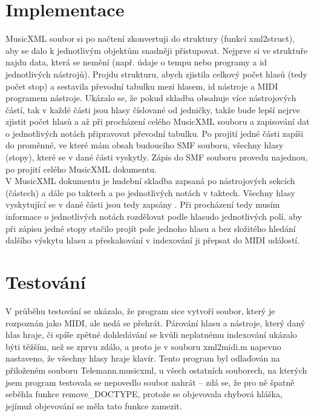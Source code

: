 \documentclass[12pt,a4paper,titlepage]{article}
\begin{document}
\section{Implementace}
MusicXML soubor si po načtení zkonvertuji do struktury (funkcí xml2struct), aby se dalo k jednotlivým objektům snadněji přistupovat. Nejprve si ve struktuře najdu data, která se nemění (např. údaje o tempu nebo programy a id jednotlivých nástrojů). Projdu strukturu, abych zjistila celkový počet hlasů (tedy počet stop) a sestavila převodní tabulku mezi hlasem, id nástroje a MIDI programem nástroje. Ukázalo se, že pokud skladba obsahuje více nástrojových částí, tak v každé části jsou hlasy číslované od jedničky, takže bude lepší nejrve zjistit počet hlasů a až při procházení celého MusicXML souboru a zapisování dat o jednotlivých notách připravovat převodní tabulku. Po projití jedné části zapíši do proměnné, ve které mám obsah budoucího SMF souboru, všechny hlasy (stopy), které se v dané části vyskytly. Zápis do SMF souboru provedu najednou, po projití celého MusicXML dokumentu.\\
V MusicXML dokumentu je hudební skladba zapsaná po nástrojových sekcích (částech) a dále po taktech a po jednotlivých notách v taktech. Všechny hlasy vyskytující se v dané části jsou tedy zapsány . Při procházení tedy musím informace o jednotlivých notách rozdělovat podle hlasudo jednotlivých polí, aby při zápisu jedné stopy stačilo projít pole jednoho hlasu a bez složitého hledání dalšího výskytu hlasu a přeskakování v indexování ji přepsat do MIDI událostí.\\
\section{Testování}
V průběhu testování se ukázalo, že program sice vytvoří soubor, který je rozpoznán jako MIDI, ale nedá se přehrát. Párování hlasu a nástroje, který daný hlas hraje, či spíše zpětné dohledávání se kvůli neplatnému indexování ukázalo býti těžším, než se zprvu zdálo, a proto je v souboru xml2midi.m napevno nastaveno, že všechny hlasy hraje klavír. Tento program byl odlaďován na přiloženém souboru Telemann.musicxml, u všech ostatních souborech, na kterých jsem program testovala se nepovedlo soubor nahrát -- zdá se, že pro ně špatně seběhla funkce remove\_DOCTYPE, protože se objevovala chybová hláška, jejímuž objevování se měla tato funkce zamezit. 
\end{document}
